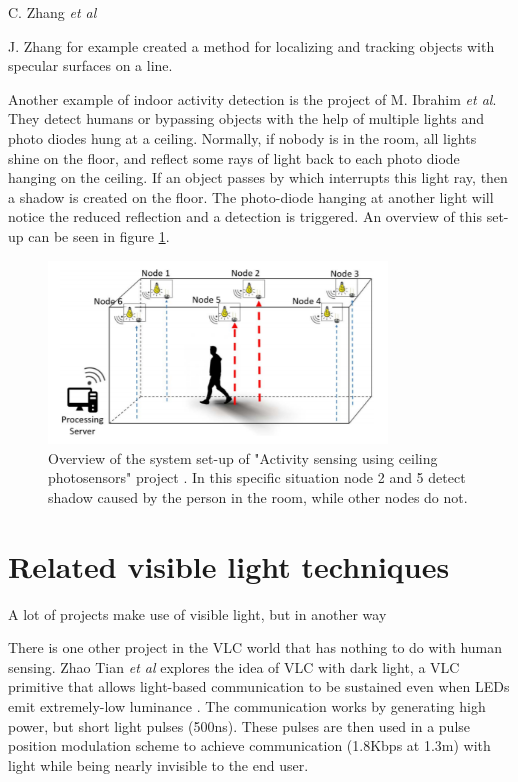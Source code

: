 C. Zhang \textit{et al} \cite{Near_Field_VLS}

J. Zhang for example created a method for localizing and tracking objects with specular surfaces on a line\cite{JakesWork}. 

Another example of indoor activity detection is the project of M. Ibrahim \textit{et al}. They detect humans or bypassing objects with the help of multiple lights and photo diodes hung at a ceiling\cite{Ceiling_PD}. Normally, if nobody is in the room, all lights shine on the floor, and reflect some rays of light back to each photo diode hanging on the ceiling. If an object passes by which interrupts this light ray, then a shadow is created on the floor. The photo-diode hanging at another light will notice the reduced reflection and a detection is triggered. An overview of this set-up can be seen in figure \ref{fig:Ceiling_PD}.

\begin{figure}[]
	\centering
	\label{fig:Ceiling_PD}
	\includegraphics[width=90mm]{pics/lightspdceiling.png}
	\caption{Overview of the system set-up of "Activity sensing using ceiling photosensors" project \cite{Ceiling_PD}. In this specific situation node 2 and 5 detect shadow caused by the person in the room, while other nodes do not.}
\end{figure}

\section{Related visible light techniques}
A lot of projects make use of visible light, but in another way 

There is one other project in the VLC world that has nothing to do with human sensing. Zhao Tian \textit{et al} explores the idea of VLC with dark light, a VLC primitive that allows light-based communication to be sustained even when LEDs emit extremely-low luminance \cite{Dark_Light_Rises} \cite{Dark_VLC}. The communication works by generating high power, but short light pulses (500ns). These pulses are then used in a pulse position modulation scheme to achieve communication (1.8Kbps at 1.3m) with light while being nearly invisible to the end user.

\cite{Human_Sensing_Using_VLC}
